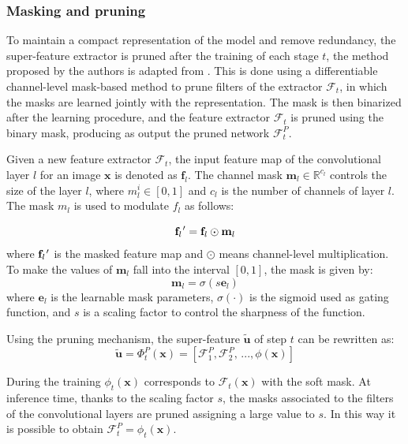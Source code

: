 \subsubsection{Masking and pruning}
\label{sec:masking-pruning}
To maintain a compact representation of the model and remove redundancy, the super-feature extractor is pruned after the training of each stage $t$, the method proposed by the authors is adapted from \cite{serra2018overcoming}. This is done using a differentiable channel-level mask-based method to prune filters of the extractor $\mathcal{F}_t$, in which
the masks are learned jointly with the representation. The mask is then binarized after the learning procedure, and the feature extractor $\mathcal{F}_t$ is pruned using the binary mask, producing as output the pruned network $\mathcal{F}_t^{P}$.

Given a new feature extractor $\mathcal{F}_t$, the input feature map of the convolutional layer $l$ for an image $\textbf{x}$ is denoted as $\textbf{f}_l$. The channel mask $\textbf{m}_l \in \mathbb{R}^{c_l}$ controls the size of the layer $l$, where $m_l^i \in [0, 1]$ and $c_l$ is the number of channels of layer $l$. The mask $m_l$ is used to modulate $f_l$ as follows:

\begin{equation}
    \textbf{f}_l \kern 0.05em ' = \textbf{f}_l \odot \textbf{m}_l
\end{equation}
where $\textbf{f}_l \kern 0.05em '$ is the masked feature map and $\odot$ means channel-level multiplication. To make the values of $\textbf{m}_l$ fall into the interval $[0,1]$, the mask is given by:
\begin{equation}\label{eq:mask}
    \textbf{m}_l = \sigma(s \textbf{e}_l)
\end{equation}
where $\textbf{e}_l$ is the learnable mask parameters, $\sigma(\cdot)$ is the sigmoid used as gating function, and $s$ is a scaling factor to control the sharpness of the function.


Using the pruning mechanism, the super-feature $\tilde{\textbf{u}}$ of step $t$ can be rewritten as:
\begin{equation}
    \tilde{\textbf{u}} = \Phi_t^P(\textbf{x}) = [\mathcal{F}_1^P, \mathcal{F}_2^P,\, ..., \phi(\textbf{x})]
\end{equation}

During the training $\phi_t(\textbf{x})$ corresponds to $\mathcal{F}_t(\textbf{x})$ with the soft mask. At inference time, thanks to the scaling factor $s$, the masks associated to the filters of the convolutional layers are pruned assigning a large value to $s$. In this way it is possible to obtain $\mathcal{F}_t^P = \phi_t(\textbf{x})$.


